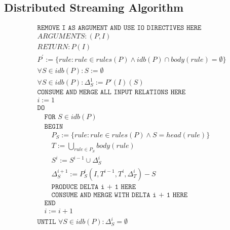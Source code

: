 \documentclass{article}
\begin{document}
\subsection{Distributed Streaming Algorithm}
\[
\begin{array}{l}
\texttt{REMOVE I AS ARGUMENT AND USE IO DIRECTIVES HERE} \\
ARGUMENTS : (P, I) \\
RETURN : P(I) \\
P^{'} := \{ rule : rule \in rules(P) \land idb(P) \cap body(rule) = \emptyset \} \\
\forall S \in idb(P) : S := \emptyset \\
\forall S \in idb(P) : \Delta^{1}_{S} := P'(I)(S) \\
\texttt{CONSUME AND MERGE ALL INPUT RELATIONS HERE} \\
i := 1 \\
\texttt{DO} \\
\quad \texttt{FOR } S \in idb(P) \\
\quad \texttt{BEGIN} \\
\quad \quad P_{S} := \{ rule : rule \in rules(P) \land S = head(rule) \} \\
\quad \quad T := \bigcup_{rule \in P_{S}} body(rule) \\
\quad \quad S^{i} := S^{i-1} \cup \Delta^{i}_{S} \\
\quad \quad \Delta^{i+1}_{S} := P^{i}_{S}(I, T^{i-1}, T^{i}, \Delta^{i}_{T}) - S \\
\quad \quad \texttt{PRODUCE DELTA i + 1 HERE} \\
\quad \quad \texttt{CONSUME AND MERGE WITH DELTA i + 1 HERE} \\
\quad \texttt{END} \\
\quad i := i + 1 \\
\texttt{UNTIL } \forall S \in idb(P) : \Delta^{i}_{S} = \emptyset \\
\end{array}
\]
\end{document}
